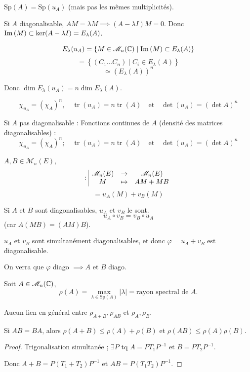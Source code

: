 
$\text{Sp}(A) = \text{Sp}(u_A)$ (mais pas les mêmes multiplicités).

Si $A$ diagonalisable, $AM = \lambda M \implies (A - \lambda I) M = 0$.
Donc $\operatorname{Im} \,(M) \subset \ker(A - \lambda I) = E_\lambda(A)$.

\[ 
    E_\lambda(u_A) = \{ M \in \mathscr M_n(\mathbb{C}) \mid \operatorname{Im} \,(M) \subset E_\lambda(A) \} 
\]
\[ 
    = \left\{ (C_1 \dots C_n) \mid C_i \in E_\lambda(A) \right\} 
\]
\[ 
    \simeq (E_\lambda(A))^n 
\]

Donc $\dim E_\lambda(u_A) = n \dim E_\lambda(A)$.

\[ \chi_{u_A} = (\chi_A)^n, \quad \operatorname{tr}(u_A) = n \operatorname{tr}(A) \quad \text{et} \quad \det(u_A) = (\det A)^n \]

Si $A$ pas diagonalisable :
Fonctions continues de $A$ (densité des matrices diagonalisables) :
\[ \chi_{u_A} = (\chi_A)^n ; \quad \operatorname{tr}(u_A) = n \operatorname{tr}(A) \quad \text{et} \quad \det(u_A) = (\det A)^n \]

\lvspace
{} $A, B \in \mathscr M_n(E)$, 
\[
    : \space \begin{array}{|ccc} \displaystyle \mathscr M_n(E) & \to & \displaystyle \mathscr M_n(E) \\ \displaystyle M & \mapsto & \displaystyle AM + MB \end{array}
\]
\[ = u_A(M) + v_B(M) \]

Si $A$ et $B$ sont diagonalisables, $u_A$ et $v_B$ le sont.
\[ u_A \circ v_B = v_B \circ u_A \]
(car $A(MB) = (AM)B$).

$u_A$ et $v_B$ sont simultanément diagonalisables, et donc $\varphi = u_A + v_B$ est diagonalisable.

On verra que $\varphi$ diago $\implies A$ et $B$ diago.

 Soit $A \in \mathscr M_n(\mathbb{C})$,
\[ \rho(A) = \max_{\lambda \in \text{Sp}(A)} |\lambda| = \text{rayon spectral de } A. \]

Aucun lien en général entre $\rho_{A+B}, \rho_{AB}$ et $\rho_A, \rho_B$.

\begin{theoreme}{}{}
    Si $AB = BA$, alors $\rho(A+B) \leqslant \rho(A) + \rho(B)$
    et $\rho(AB) \leqslant \rho(A) \rho(B)$.
\end{theoreme}

\begin{proof}
    Trigonalisation simultanée ; $\exists P$ tq $A = P T_1 P^{-1}$ et $B = P T_2 P^{-1}$.
    
    Donc $A+B = P(T_1 + T_2) P^{-1}$
    et $AB = P(T_1 T_2) P^{-1}$.
\end{proof}

